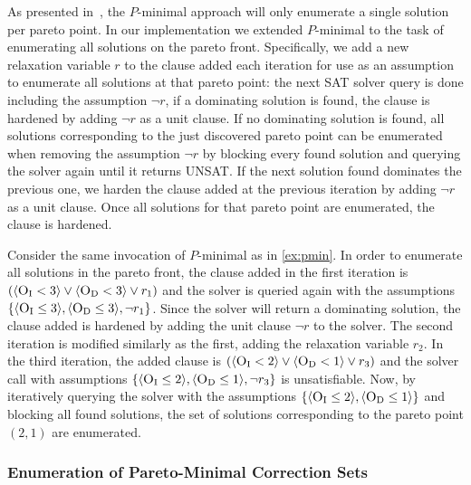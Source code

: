 As presented in~\cite{DBLP:conf/cp/SohBTB17}, the $P$-minimal approach will only enumerate a single solution per pareto point.
In our implementation we extended $P$-minimal to the task of enumerating all solutions on the pareto front.
Specifically, we add a new relaxation variable $r$ to the clause added each iteration for use as an assumption to enumerate all solutions at that pareto point:
the next SAT solver query is done including the assumption $\lnot r$, if a dominating solution is found, the clause is hardened by adding $\lnot r$ as a unit clause.
If no dominating solution is found, all solutions corresponding to the just discovered pareto point can be enumerated when removing the assumption $\lnot r$ by blocking every found solution and querying the solver again until it returns UNSAT.
If the next solution found dominates the previous one, we harden the clause added at the previous iteration by adding $\lnot r$ as a unit clause.
Once all solutions for that pareto point are enumerated, the clause is hardened.
\begin{example}
  Consider the same invocation of $P$-minimal as in \cref{ex:pmin}.
  In order to enumerate all solutions in the pareto front, the clause added in the first iteration is $(\langle \textsc{O}_{\text{I}} < 3 \rangle \lor \langle \textsc{O}_{\text{D}} < 3 \rangle \lor r_1)$ and the solver is queried again with the assumptions $\{ \langle \textsc{O}_{\text{I}} \leq 3 \rangle, \langle \textsc{O}_{\text{D}} \leq 3 \rangle, \lnot r_1 \}$.
  Since the solver will return a dominating solution, the clause added is hardened by adding the unit clause $\lnot r$ to the solver.
  The second iteration is modified similarly as the first, adding the relaxation variable $r_2$.
  In the third iteration, the added clause is $(\langle \textsc{O}_{\text{I}} < 2 \rangle \lor \langle \textsc{O}_{\text{D}} < 1 \rangle \lor r_3)$ and the solver call with assumptions $\{ \langle \textsc{O}_{\text{I}} \leq 2 \rangle, \langle \textsc{O}_{\text{D}} \leq 1 \rangle, \lnot r_3 \}$ is unsatisfiable.
  Now, by iteratively querying the solver with the assumptions $\{ \langle \textsc{O}_{\text{I}} \leq 2 \rangle, \langle \textsc{O}_{\text{D}} \leq 1 \rangle \}$ and blocking all found solutions, the set of solutions corresponding to the pareto point $(2,1)$ are enumerated.
\end{example}

\subsubsection{Enumeration of Pareto-Minimal Correction Sets\label{sec:pareto-mcs}}


